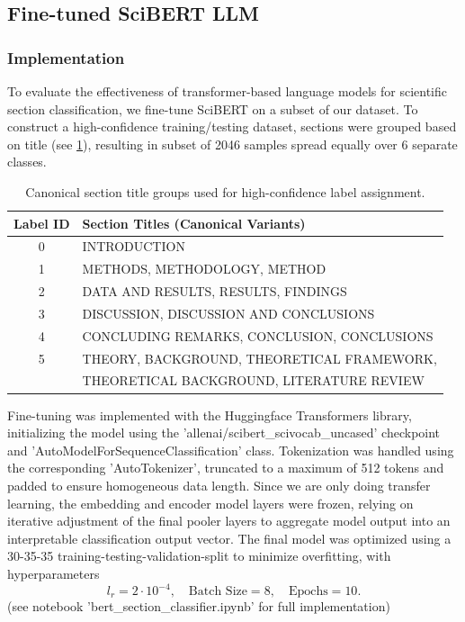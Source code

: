 \subsection{Fine-tuned SciBERT LLM}
\subsubsection{Implementation}
To evaluate the effectiveness of transformer-based language models for scientific section classification, we fine-tune SciBERT on a subset of our dataset. To construct a high-confidence training/testing dataset, sections were grouped based on title (see \cref{tab:101}), resulting in subset of 2046 samples spread equally over 6 separate classes.
\begin{table}[h!]
\centering
\begin{tabular}{|c|l|}
\hline
\textbf{Label ID} & \textbf{Section Titles (Canonical Variants)} \\
\hline
0 & INTRODUCTION \\
\hline
1 & METHODS, METHODOLOGY, METHOD \\
\hline
2 & DATA AND RESULTS, RESULTS, FINDINGS \\
\hline
3 & DISCUSSION, DISCUSSION AND CONCLUSIONS \\
\hline
4 & CONCLUDING REMARKS, CONCLUSION, CONCLUSIONS \\
\hline
5 & THEORY, BACKGROUND, THEORETICAL FRAMEWORK, \\
  & THEORETICAL BACKGROUND, LITERATURE REVIEW \\
\hline
\end{tabular}
\caption{Canonical section title groups used for high-confidence label assignment.}
\label{tab:101}
\end{table}

Fine-tuning was implemented with the Huggingface Transformers library, initializing the model using the 'allenai/scibert\_scivocab\_uncased' checkpoint and 'AutoModelForSequenceClassification' class. Tokenization was handled using the corresponding 'AutoTokenizer', truncated to a maximum of 512 tokens and padded to ensure homogeneous data length. Since we are only doing transfer learning, the embedding and encoder model layers were frozen, relying on iterative adjustment of the final pooler layers to aggregate model output into an interpretable classification output vector. The final model was optimized using a 30-35-35 training-testing-validation-split to minimize overfitting, with hyperparameters
$$
l_r = 2\cdot 10^{-4}, \quad \text{Batch Size} = 8, \quad \text{Epochs} = 10.
$$
(see notebook 'bert\_section\_classifier.ipynb' for full implementation)
